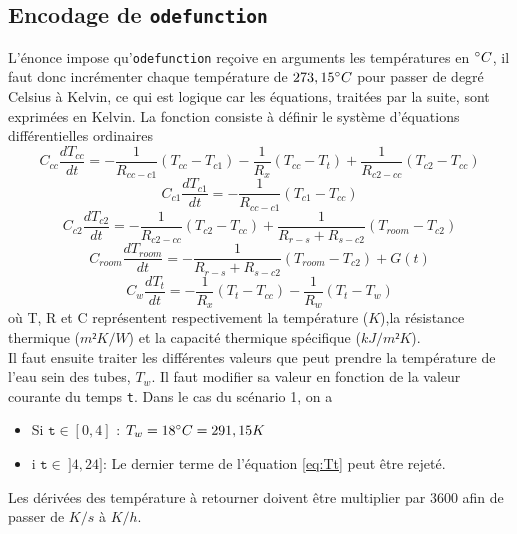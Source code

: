 \documentclass[12pt]{article}
\begin{document}
    \subsection{Encodage de \texttt{odefunction}}
        L'énonce impose qu'\texttt{odefunction} reçoive en arguments les températures en $\degree C$, il faut donc incrémenter chaque température de $273,15\degree C$ pour passer de degré Celsius à Kelvin, ce qui est logique car les équations, traitées par la suite, sont exprimées en Kelvin. La fonction consiste à définir le système d'équations différentielles ordinaires 
        \begin{equation}
           C_{cc} \frac{dT_{cc}}{dt} = -\frac{1}{R_{cc-c1}} (T_{cc} - T_{c1}) - \frac{1}{R_{x}} (T_{cc} - T_{t}) + \frac{1}{R_{c2-cc}} (T_{c2} - T_{cc})
            \label{eq:Tcc}
        \end{equation}
        \begin{equation}
            C_{c1} \frac{dT_{c1}}{dt} = -\frac{1}{R_{cc-c1}} (T_{c1} - T_{cc})
            \label{eq:Tc1}
        \end{equation}
        \begin{equation}
            C_{c2} \frac{dT_{c2}}{dt} = -\frac{1}{R_{c2-cc}}(T_{c2} - T_{cc}) + \frac{1}{R_{r-s} + R_{s-c2}}(T_{room} - T_{c2})
            \label{eq:Tc2}
        \end{equation}
        \begin{equation}
            C_{room} \frac{dT_{room}}{dt} = -\frac{1}{R_{r-s} + R_{s-c2}} (T_{room} - T_{c2}) + G(t)
            \label{eq:Troom}
        \end{equation}
        \begin{equation}
            C_w \frac{dT_t}{dt} = -\frac{1}{R_x} (T_t - T_{cc}) - \frac{1}{R_w} (T_t - T_w)
            \label{eq:Tt}
        \end{equation}
        où T, R et C représentent respectivement la température ($K$),la résistance thermique ($m²K/W$) et la capacité thermique spécifique ($kJ/m²K$). \\
        
        
        Il faut ensuite traiter les différentes valeurs que peut prendre la température de l'eau sein des tubes, $T_w$. Il faut modifier sa valeur en fonction de la valeur courante du temps \texttt{t}.
        Dans le cas du scénario 1, on a
        \begin{itemize}
            \item Si $\texttt{t} \in [0,4]$ :
            $T_w = 18\degree C = 291,15 K$
            \item i $\texttt{t} \in \: ]4, 24]$: Le dernier terme de l'équation \ref{eq:Tt} peut être rejeté.
        \end{itemize}
        Les dérivées des température à retourner doivent être multiplier par $3600$ afin de passer de $K/s$ à $K/h$.
        
\end{document}
